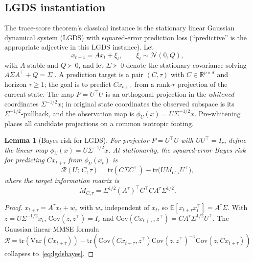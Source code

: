 \documentclass[final,3p,times]{elsarticle}
\newtheorem{lemma}[theorem]{Lemma}
\newcommand{\tr}{\mathrm{tr}}
\newcommand{\R}{\mathbb{R}}
\newcommand{\E}{\mathbb{E}}
\begin{document}
\subsection{LGDS instantiation}

The trace-score theorem's classical instance is the stationary linear
Gaussian dynamical system (LGDS) with squared-error prediction loss
(``predictive'' is the appropriate adjective in this LGDS instance).
Let
\begin{equation}
x_{t+1} = A x_t + \xi_t, \qquad \xi_t\sim\mathcal{N}(0,Q),
\end{equation}
with $A$ stable and $Q\succ 0$, and let $\Sigma\succ 0$ denote the
stationary covariance solving $A\Sigma A^\top+Q=\Sigma$ \cite{Kailath1980}.
A prediction target is a pair $(C,\tau)$ with $C\in\R^{p\times d}$ and
horizon $\tau\ge 1$; the goal is to predict $Cx_{t+\tau}$ from a rank-$r$
projection of the current state.
The map $P=U^\top U$ is an orthogonal projection in the
\emph{whitened} coordinates $\Sigma^{-1/2}x$; in original state
coordinates the observed subspace is its $\Sigma^{-1/2}$-pullback,
and the observation map is $\phi_U(x)=U\Sigma^{-1/2}x$.
Pre-whitening places all candidate projections on a common isotropic
footing.

\begin{lemma}[Bayes risk for LGDS]\label{lem:bayes}
For projector $P=U^\top U$ with $UU^\top=I_r$, define the linear map
$\phi_U(x)=U\Sigma^{-1/2}x$.
At stationarity, the squared-error Bayes risk for predicting $Cx_{t+\tau}$
from $\phi_U(x_t)$ is
\begin{equation}\label{eq:lgdsbayes}
\mathcal{R}(U;\,C,\tau)
= \tr(C\Sigma C^\top) - \tr\!\bigl(U M_{C,\tau} U^\top\bigr),
\end{equation}
where the \emph{target information matrix} is
\begin{equation}\label{eq:M}
M_{C,\tau} = \Sigma^{1/2}(A^\tau)^\top C^\top C A^\tau \Sigma^{1/2}.
\end{equation}
\end{lemma}

\begin{proof}
$x_{t+\tau}=A^\tau x_t+w_\tau$ with $w_\tau$ independent of $x_t$, so
$\E[x_{t+\tau}x_t^\top]=A^\tau\Sigma$.
With $z=U\Sigma^{-1/2}x_t$, $\mathrm{Cov}(z,z^\top)=I_r$ and
$\mathrm{Cov}(Cx_{t+\tau},z^\top)=CA^\tau\Sigma^{1/2}U^\top$.
The Gaussian linear MMSE formula
$\mathcal{R}=\tr(\mathrm{Var}(Cx_{t+\tau}))-\tr(\mathrm{Cov}(Cx_{t+\tau},z^\top)\mathrm{Cov}(z,z^\top)^{-1}\mathrm{Cov}(z,Cx_{t+\tau}))$
collapses to~\eqref{eq:lgdsbayes}.
\end{proof}
\end{document}
